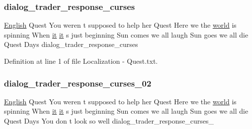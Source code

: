 \subsubsection{\texorpdfstring{dialog\_trader\_response\_curses}{dialog\_trader\_response\_curses}}
{\footnotesize\ttfamily \mbox{\hyperlink{_sphere_i_i_01_winter_01_project_2_config_2_localization_8txt_ad896b63205779b1b09e86d941ce13976}{English}} Quest You weren t supposed to help her Quest Here we the \mbox{\hyperlink{_sphere_i_i_01_music_01_boxes_2_config_2_localization_8txt_a7ede01351426b1b7f6c1ce5f794e474f}{world}} is spinning When \mbox{\hyperlink{_the_01_restless_01_curse_2_config_2_localization_01-_01_quest_8txt_a741b285909bea4855b886664c2dcd50c}{it}} \mbox{\hyperlink{_the_01_restless_01_curse_2_config_2_localization_01-_01_quest_8txt_a741b285909bea4855b886664c2dcd50c}{it}} s just beginning Sun comes we all laugh Sun goes we all die Quest Days dialog\+\_\+trader\+\_\+response\+\_\+curses}



Definition at line 1 of file Localization -\/ Quest.\+txt.

\mbox{\label{_the_01_restless_01_curse_2_config_2_localization_01-_01_quest_8txt_a2d2995d6005968ae69129a97acba922e}} 
\subsubsection{\texorpdfstring{dialog\_trader\_response\_curses\_02}{dialog\_trader\_response\_curses\_02}}
{\footnotesize\ttfamily \mbox{\hyperlink{_sphere_i_i_01_winter_01_project_2_config_2_localization_8txt_ad896b63205779b1b09e86d941ce13976}{English}} Quest You weren t supposed to help her Quest Here we the \mbox{\hyperlink{_sphere_i_i_01_music_01_boxes_2_config_2_localization_8txt_a7ede01351426b1b7f6c1ce5f794e474f}{world}} is spinning When \mbox{\hyperlink{_the_01_restless_01_curse_2_config_2_localization_01-_01_quest_8txt_a741b285909bea4855b886664c2dcd50c}{it}} \mbox{\hyperlink{_the_01_restless_01_curse_2_config_2_localization_01-_01_quest_8txt_a741b285909bea4855b886664c2dcd50c}{it}} s just beginning Sun comes we all laugh Sun goes we all die Quest Days You don t look so well dialog\+\_\+trader\+\_\+response\+\_\+curses\+\_}



